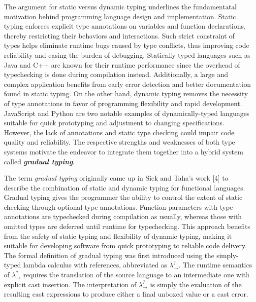 The argument for static versus dynamic typing underlines the fundamentatal 
motivation behind programming language design and implementation. Static 
typing enforces explicit type annotations on variables and function 
declarations, thereby restricting their behaviors and interactions. 
Such strict constraint of types helps eliminate runtime bugs caused 
by type conflicts, thus improving code reliability and easing the 
burden of debugging. Statically-typed languages such as Java 
and C++ are known for their runtime performance since the overhead of 
typechecking is done during compilation instead. Additionally, a large 
and complex application benefits from early error detection and better 
documentation found in static typing. On the other hand, dynamic typing 
removes the necessity of type annotations in favor of programming 
flexibility and rapid development. JavaScript and Python are two notable 
examples of dynamically-typed languages suitable for quick prototyping 
and adjustment to changing specifications. However, the lack of 
annotations and static type checking could impair code quality and 
reliability. The respective strengths and 
weaknesses of both type systems motivate the endeavor to integrate them 
together into a hybrid system called \textit{\textbf{gradual typing}}. 

The term \textit{gradual typing} originally came up in Siek and 
Taha's work [4] to describe the combination of static and dynamic typing 
for functional languages. Gradual typing gives the programmer the ability 
to control the extent of static checking through optional type annotations. 
Function parameters with type annotations are typechecked during 
compilation as usually, whereas those with omitted types are deferred until 
runtime for typechecking. This approach benefits from the safety of static 
typing and flexibility of dynamic typing, making it suitable for developing 
software from quick prototyping to reliable code delivery. The formal 
definition of gradual typing was first introduced using the 
simply-typed lambda calculus with references, abbreviated as $\lambda ^? _{\rightarrow}$. 
The runtime semantics of $\lambda ^? _{\rightarrow}$ requires the 
translation of the source language to an intermediate one with explicit 
cast insertion. The interpretation of $\lambda ^? _{\rightarrow}$ 
is simply the evaluation of the resulting cast expressions to produce 
either a final unboxed value or a cast error.

